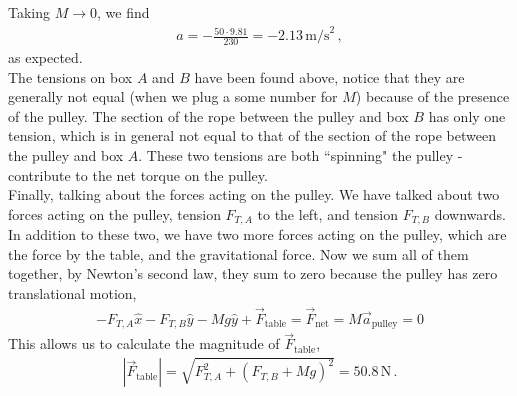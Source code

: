 \documentclass[11pt]{article}
\begin{document}
\noindent Taking $M \to 0$, we find
\begin{align*}
a = -\frac{50 \cdot 9.81}{230} = -2.13\,\text{m/s}^2\,,
\end{align*}
as expected.\\

The tensions on box $A$ and $B$ have been found above, notice that they are generally not equal (when we plug a some number for $M$) because of the presence of the pulley. The section of the rope between the pulley and box $B$ has only one tension, which is in general not equal to that of the section of the rope between the pulley and box $A$. These two tensions are both ``spinning" the pulley - contribute to the net torque on the pulley. \\

Finally, talking about the forces acting on the pulley. We have talked about two forces acting on the pulley, tension $F_{T,A}$ to the left, and tension $F_{T,B}$ downwards. In addition to these two, we have two more forces acting on the pulley, which are the force by the table, and the gravitational force. Now we sum all of them together, by Newton's second law, they sum to zero because the pulley has zero translational motion, 
\begin{align*}
-F_{T,A}\hat{x} -F_{T,B}\hat{y}-Mg \hat{y} +\vec{F}_{\text{table}}   = \vec{F}_{\text{net}} = M\vec{a}_{\text{pulley}}= 0
\end{align*}
This allows us to calculate the magnitude of $\vec{F}_{\text{table}}$, 
\begin{align*}
|\vec{F}_{\text{table}}| = \sqrt{F_{T,A}^2 + (F_{T,B} + Mg)^2 } = 50.8\,\text{N}\,.
\end{align*}
\end{document}
